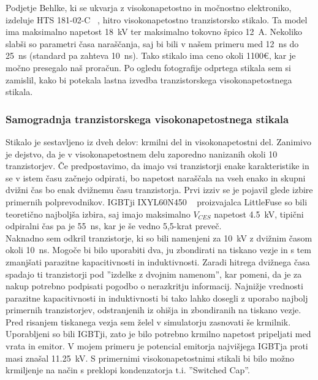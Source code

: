 \documentclass[a4paper,twoside,openright,12pt,Slovene]{book}
\begin{document}
	Podjetje Behlke, ki se ukvarja z visokonapetostno in močnostno elektroniko, izdeluje HTS 181-02-C ~\cite{Behlke:HTS181-02-C}, hitro visokonapetostno tranzistorsko stikalo. Ta model ima maksimalno napetost \SI{18}{\kilo\volt} ter maksimalno tokovno špico \SI{12}{\ampere}. Nekoliko slabši so parametri časa naraščanja, saj bi bili v našem primeru med \SI{12}{\nano\second} do \SI{25}{\nano\second} (standard pa zahteva \SI{10}{\nano\second}). Tako stikalo ima ceno okoli 1100\euro , kar je močno presegalo naš proračun. Po ogledu fotografije odprtega stikala sem si zamislil, kako bi potekala lastna izvedba tranzistorskega visokonapetostnega stikala.
	
	\subsubsection{Samogradnja tranzistorskega visokonapetostnega stikala} \label{Samogradnja tranzistorskega visokonapetostnega stikala}
	
	Stikalo je sestavljeno iz dveh delov: krmilni del in visokonapetostni del. Zanimivo je dejstvo, da je v visokonapetostnem delu zaporedno nanizanih okoli 10 tranzistorjev. Če predpostavimo, da imajo vsi tranzistorji enake karakteristike in se v istem času začnejo odpirati, bo napetost naraščala na vseh enako in skupni dvižni čas bo enak dvižnemu času tranzistorja. Prvi izziv se je pojavil glede izbire primernih polprevodnikov. IGBTji IXYL60N450 ~\cite{IXYS:IXYL60N450} proizvajalca LittleFuse so bili teoretično najboljša izbira, saj imajo maksimalno \(V_{CES}\) napetost \SI{4,5}{\kilo\volt}, tipični odpiralni čas pa je \SI{55}{\nano\second}, kar je še vedno 5,5-krat preveč. 
    ~\\Naknadno sem odkril tranzistorje, ki so bili namenjeni za \SI{10}{\kilo\volt} z dvižnim časom okoli \SI{10}{\nano\second}. Mogoče bi bilo uporabiti dva, ju zbondirati na tiskano vezje in s tem zmanjšati parazitne kapacitivnosti in induktivnosti. Zaradi hitrega dvižnega časa spadajo ti tranzistorji pod ''izdelke z dvojnim namenom'', kar pomeni, da je za nakup potrebno podpisati pogodbo o nerazkritju informacij. Najnižje vrednosti parazitne kapacitivnosti in induktivnosti bi tako lahko dosegli z uporabo najbolj primernih tranzistorjev, odstranjenih iz ohišja in zbondiranih na tiskano vezje. Pred risanjem tiskanega vezja sem želel v simulatorju zasnovati še krmilnik. Uporabljeni so bili IGBTji, zato je bilo potrebno krmilno napetost pripeljati med vrata in emitor. V mojem primeru je potencial emitorja najvišjega IGBTja proti masi znašal \SI{11,25}{\kilo\volt}. S primernimi visokonapetostnimi stikali bi bilo možno krmiljenje na način s preklopi kondenzatorja t.i. ''Switched Cap''.
\end{document}

